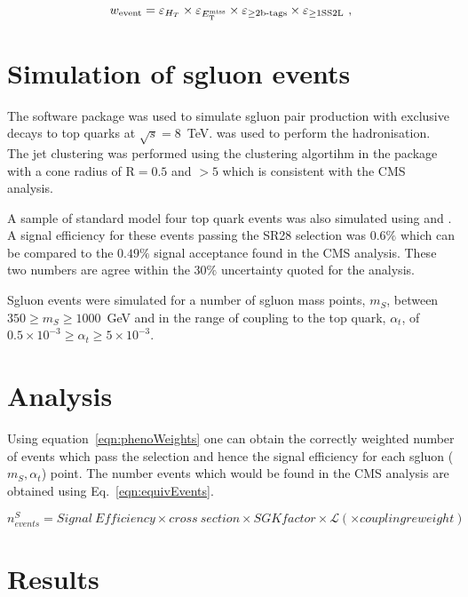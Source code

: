 \begin{equation} \label{eqn:phenoWeights}
  w_{\rm event} = \varepsilon_{H_T} \times  \varepsilon_{E_{\mathrm{T}}^{\text{miss}}} \times
    \varepsilon_{\geq\text{2b-tags}} \times \varepsilon_{\geq1 \text{SS2L}} \ ,
\end{equation}

\section{Simulation of sgluon events}
The \MGfive software package was used to simulate sgluon pair production with exclusive decays to top quarks at $\sqrt{s}=8$~TeV. \PYTHIAsix was used to perform the hadronisation. The jet clustering was performed using the \antikt clustering algortihm in the \FASTJET package with a cone radius of R$=0.5$ and \pt$>5$ which is consistent with the CMS analysis.

A sample of standard model four top quark events was also simulated using \MGfive and \PYTHIAsix. A signal efficiency for these events passing the SR28 selection was $0.6\%$ which can be compared to the $0.49\%$ signal acceptance found in the CMS analysis. These two numbers are agree within the $30\%$ uncertainty quoted for the analysis.

Sgluon events were simulated for a number of sgluon mass points, $m_{S}$, between $350 \geq m_{S} \geq 1000$~GeV and in the range of coupling to the top quark, $\alpha_{t}$, of $0.5 \times 10^{-3}\geq \alpha_{t} \geq 5 \times 10^{-3}$.

\section{Analysis}

Using equation~\ref{eqn:phenoWeights} one can obtain the correctly weighted number of events which pass the selection and hence the signal efficiency for each sgluon ($m_{S},\alpha_{t}$) point. The number events which would be found in the CMS analysis are obtained using Eq.~\ref{eqn:equivEvents}.

\begin{equation}
n^{S}_{events} = Signal~Efficiency\times cross~section \times SGKfactor \times \mathcal{L} \left(\times coupling reweight\right)
\label{eqn:equivEvents}
\end{equation}


\section{Results}



